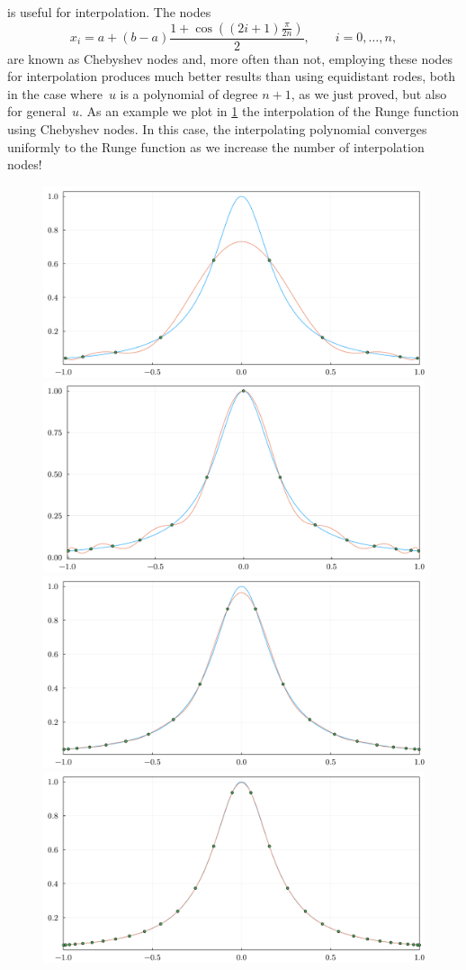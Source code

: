  is useful for interpolation.
The nodes
\begin{equation}
    x_i = a + (b-a) \frac{1 + \cos \left( (2i + 1) \frac{\pi}{2 n} \right)}{2}, \qquad i = 0, \dotsc, n,
\end{equation}
are known as Chebyshev nodes and,
more often than not, employing these nodes for interpolation produces much better results than using equidistant rodes,
both in the case where~$u$ is a polynomial of degree $n+1$,
as we just proved,
but also for general~$u$.
As an example we plot in \cref{fig:cheb_runge} the interpolation of the Runge function using Chebyshev nodes.
In this case, the interpolating polynomial converges uniformly to the Runge function as we increase the number of interpolation nodes!
\begin{figure}[ht]
    \centering
    \includegraphics[width=0.49\linewidth]{figures/interpolation_cheb_runge_10.pdf}
    \includegraphics[width=0.49\linewidth]{figures/interpolation_cheb_runge_15.pdf}
    \includegraphics[width=0.49\linewidth]{figures/interpolation_cheb_runge_20.pdf}
    \includegraphics[width=0.49\linewidth]{figures/interpolation_cheb_runge_30.pdf}
    \label{fig:cheb_runge}
\end{figure}

